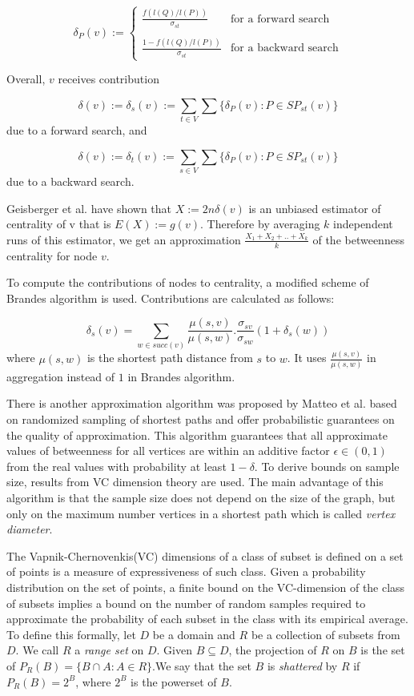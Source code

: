 \documentclass[runningheads,a4paper]{llncs}
\begin{document}
\begin{equation*}
	\delta_{P}(v) := \begin{cases}
					\frac{f(l(Q)/l(P))}{\sigma_{st}} & \text{for a forward search} \\\\
					\frac{1 - f(l(Q)/l(P))}{\sigma_{st}} & \text{for a backward search} 
					\end{cases}
\end{equation*}

Overall, $v$ receives contribution 

$$\delta(v) := \delta_{s}(v) := \sum_{t \in V}\sum \{\delta_{P}(v):  P \in SP_{st}(v)\}$$
due to a forward search, and 

$$\delta(v) := \delta_{t}(v) := \sum_{s \in V}\sum \{\delta_{P}(v):  P \in SP_{st}(v)\}$$
due to a backward search. 

Geisberger et al. \cite{sanders} have shown that $X := 2n\delta(v)$ is an unbiased estimator of centrality of v that is $E(X) := g(v)$. Therefore by averaging $k$ independent runs of this estimator, we get an approximation $\frac{X_{1}+X_{2}+..+X_{k}}{k}$ of the betweenness centrality for node $v$. 

To compute the contributions of nodes to centrality, a modified scheme of Brandes algorithm is used. Contributions are calculated as follows:

$$\delta_{s}(v) = \sum_{w \in succ(v)} \frac{\mu(s,v)}{\mu(s,w)}.\frac{\sigma_{sv}}{\sigma_{sw}}(1+\delta_{s}(w))$$
where $\mu(s,w)$ is the shortest path distance from $s$ to $w$. It uses $\frac{\mu(s,v)}{\mu(s,w)}$ in aggregation instead of $1$ in Brandes algorithm. 

There  is another approximation algorithm was proposed by Matteo et al. \cite{matteo} based on randomized sampling of shortest paths and offer probabilistic guarantees on the quality of approximation. This algorithm guarantees that all approximate values of betweenness for all vertices are within an additive factor $\epsilon \in (0,1)$ from the real values with probability at least $1-\delta$. To derive bounds on sample size, results from VC dimension\cite{vc} theory are used. The main advantage of this algorithm is that the sample size does not depend on the size of the graph, but only on the maximum number vertices in a shortest path which is called \textit{vertex diameter}.  

The Vapnik-Chernovenkis(VC) dimensions of a class of subset is defined on a set of points is a measure of expressiveness of such class. Given a probability distribution on the set of points, a finite bound on the VC-dimension of the class of subsets implies a bound on the number of random samples required to approximate the probability of each subset in the class with its empirical average. To define this formally, let $D$ be a domain and $R$ be a collection of subsets from $D$. We call $R$ a \textit{range set} on $D$. Given $B \subseteq D$, the projection of $R$ on $B$ is the set of $P_{R}(B) = \{B \cap A : A \in R\}$.We say that the set $B$ is \textit{shattered} by $R$ if $P_{R}(B) = 2^{B}$, where $2^{B}$ is the powerset of $B$.
\end{document}
